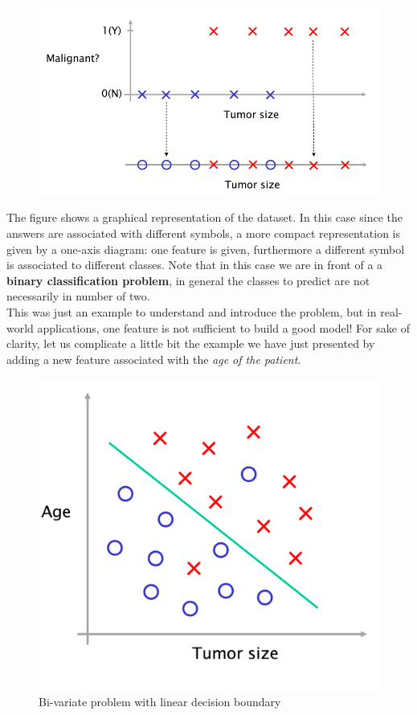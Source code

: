 \begin{figure}[h]
    \centering
    \includegraphics[scale=0.5]{img/tumor.png}
\end{figure}

The figure shows a graphical representation of the dataset. In this case since the answers are associated with different symbols, a more compact representation is given by a one-axis diagram: one feature is given, furthermore a different symbol is associated to different classes. Note that in this case we are in front of a a \textbf{binary classification problem}, in general the classes to predict are not necessarily in number of two. \\
This was just an example to understand and introduce the problem, but in real-world applications, one feature is not sufficient to build a good model! For sake of clarity, let us complicate a little bit the example we have just presented by adding a new feature associated with the \textit{age of the patient}.

\begin{figure}[h]
    \centering
    \includegraphics[scale=0.5]{img/tumor_more.png}
    \caption{Bi-variate problem with linear decision boundary}
\end{figure}

